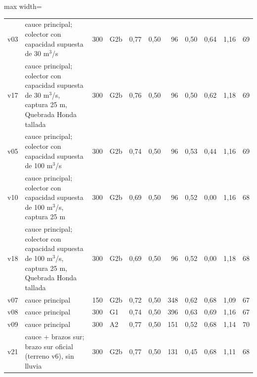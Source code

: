 \begin{table}[htbp]
{\begin{adjustbox}{max width=\textwidth}
\begin{tabular}{llrlrrrrrrr}
v03 & cauce principal; colector con capacidad supuesta de 30 m$^3$/s & 300 & G2b & 0{,}77 & 0{,}50 & 96 & 0{,}50 & 0{,}64 & 1{,}16 & 69\\
v17 & cauce principal; colector con capacidad supuesta de 30 m$^3$/s, captura 25 m, Quebrada Honda tallada & 300 & G2b & 0{,}76 & 0{,}50 & 96 & 0{,}50 & 0{,}62 & 1{,}18 & 69\\
v05 & cauce principal; colector con capacidad supuesta de 100 m$^3$/s & 300 & G2b & 0{,}74 & 0{,}50 & 96 & 0{,}53 & 0{,}44 & 1{,}16 & 69\\
v10 & cauce principal; colector con capacidad supuesta de 100 m$^3$/s, captura 25 m & 300 & G2b & 0{,}69 & 0{,}50 & 96 & 0{,}52 & 0{,}00 & 1{,}16 & 68\\
v18 & cauce principal; colector con capacidad supuesta de 100 m$^3$/s, captura 25 m, Quebrada Honda tallada & 300 & G2b & 0{,}69 & 0{,}50 & 96 & 0{,}52 & 0{,}00 & 1{,}18 & 68\\
v07 & cauce principal & 150 & G2b & 0{,}72 & 0{,}50 & 348 & 0{,}62 & 0{,}68 & 1{,}09 & 67\\
v08 & cauce principal & 300 & G1 & 0{,}74 & 0{,}50 & 396 & 0{,}63 & 0{,}69 & 1{,}16 & 67\\
v09 & cauce principal & 300 & A2 & 0{,}77 & 0{,}50 & 151 & 0{,}52 & 0{,}68 & 1{,}14 & 70\\
v21 & cauce + brazos sur; brazo sur oficial (terreno v6), sin lluvia & 300 & G2b & 0{,}77 & 0{,}50 & 131 & 0{,}45 & 0{,}68 & 1{,}11 & 68\\
\bottomrule\end{tabular}\end{adjustbox}}
\end{table}
